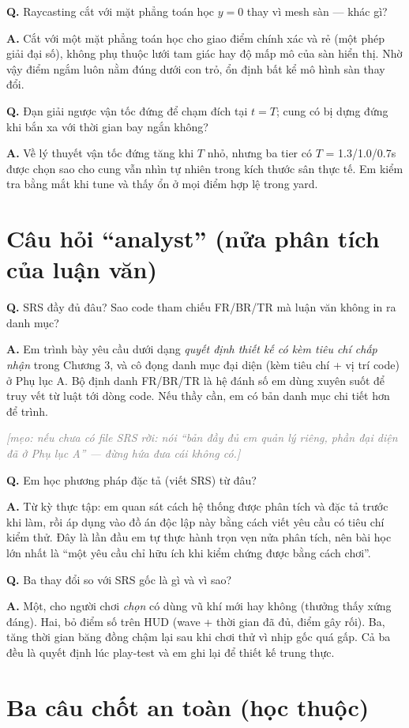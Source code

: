 \documentclass[12pt,a4paper]{article}
\newcommand{\QA}[2]{%
  \par\medskip\noindent\textbf{\textcolor{blue!60!black}{Q.}} #1\par
  \smallskip\noindent\textbf{\textcolor{green!45!black}{A.}} #2\par}
\newcommand{\tip}[1]{\par\smallskip\noindent%
  \textit{\textcolor{gray}{[mẹo: #1]}}\par}
\begin{document}
\QA{Raycasting cắt với mặt phẳng toán học $y=0$ thay vì mesh sàn --- khác gì?}
{Cắt với một mặt phẳng toán học cho giao điểm chính xác và rẻ (một phép giải đại
số), không phụ thuộc lưới tam giác hay độ mấp mô của sàn hiển thị. Nhờ vậy điểm
ngắm luôn nằm đúng dưới con trỏ, ổn định bất kể mô hình sàn thay đổi.}

\QA{Đạn giải ngược vận tốc đứng để chạm đích tại $t=T$; cung có bị dựng đứng khi
bắn xa với thời gian bay ngắn không?}
{Về lý thuyết vận tốc đứng tăng khi $T$ nhỏ, nhưng ba tier có $T$ = 1.3/1.0/0.7s
được chọn sao cho cung vẫn nhìn tự nhiên trong kích thước sân thực tế. Em kiểm tra
bằng mắt khi tune và thấy ổn ở mọi điểm hợp lệ trong yard.}

\section{Câu hỏi ``analyst'' (nửa phân tích của luận văn)}

\QA{SRS đầy đủ đâu? Sao code tham chiếu FR/BR/TR mà luận văn không in ra danh mục?}
{Em trình bày yêu cầu dưới dạng \emph{quyết định thiết kế có kèm tiêu chí chấp
nhận} trong Chương 3, và cô đọng danh mục đại diện (kèm tiêu chí + vị trí code) ở
Phụ lục A. Bộ định danh FR/BR/TR là hệ đánh số em dùng xuyên suốt để truy vết từ
luật tới dòng code. Nếu thầy cần, em có bản danh mục chi tiết hơn để trình.}
\tip{nếu chưa có file SRS rời: nói ``bản đầy đủ em quản lý riêng, phần đại diện đã ở
Phụ lục A'' --- đừng hứa đưa cái không có.}

\QA{Em học phương pháp đặc tả (viết SRS) từ đâu?}
{Từ kỳ thực tập: em quan sát cách hệ thống được phân tích và đặc tả trước khi làm,
rồi áp dụng vào đồ án độc lập này bằng cách viết yêu cầu có tiêu chí kiểm thử. Đây
là lần đầu em tự thực hành trọn vẹn nửa phân tích, nên bài học lớn nhất là ``một
yêu cầu chỉ hữu ích khi kiểm chứng được bằng cách chơi''.}

\QA{Ba thay đổi so với SRS gốc là gì và vì sao?}
{Một, cho người chơi \emph{chọn} có dùng vũ khí mới hay không (thưởng thấy xứng
đáng). Hai, bỏ điểm số trên HUD (wave + thời gian đã đủ, điểm gây rối). Ba, tăng
thời gian băng đồng chậm lại sau khi chơi thử vì nhịp gốc quá gấp. Cả ba đều là
quyết định lúc play-test và em ghi lại để thiết kế trung thực.}

\section{Ba câu chốt an toàn (học thuộc)}
\end{document}

